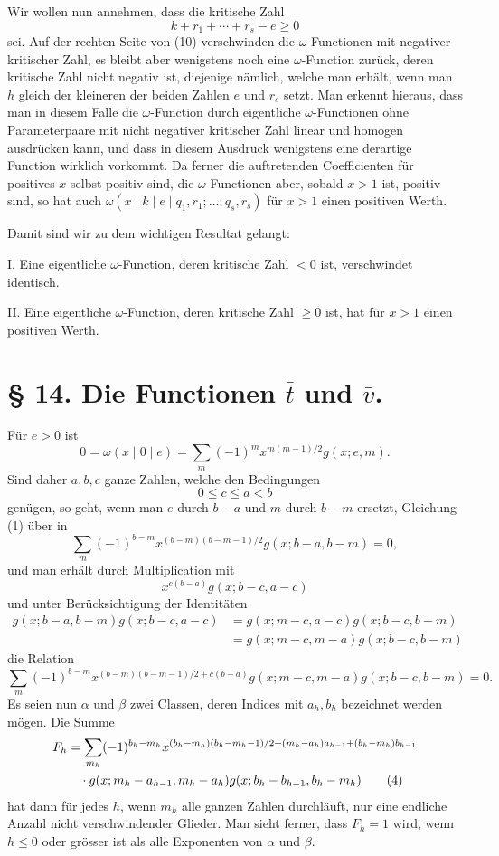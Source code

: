 Wir wollen nun annehmen, dass die kritische Zahl
\[
 k+r_1+\cdots+r_s-e\ge0
\]
sei. Auf der rechten Seite von (10) verschwinden die $\omega$-Functionen mit negativer kritischer Zahl, es bleibt aber wenigstens noch eine $\omega$-Function zurück, deren kritische Zahl nicht negativ ist, diejenige nämlich, welche man erhält, wenn man $h$ gleich der kleineren der beiden Zahlen $e$ und $r_s$ setzt. Man erkennt hieraus, dass man in diesem Falle die $\omega$-Function durch eigentliche $\omega$-Functionen ohne Parameterpaare mit nicht negativer kritischer Zahl linear und homogen ausdrücken kann, und dass in diesem Ausdruck wenigstens eine derartige Function wirklich vorkommt. Da ferner die auftretenden Coefficienten für positives $x$ selbst positiv sind, die $\omega$-Functionen aber, sobald $x>1$ ist, positiv sind, so hat auch $\omega(x\mid k\mid e\mid q_1,r_1;\ldots;q_s,r_s)$ für $x>1$ einen positiven Werth.

Damit sind wir zu dem wichtigen Resultat gelangt:

I. Eine eigentliche $\omega$-Function, deren kritische Zahl $<0$ ist, verschwindet identisch.

II. Eine eigentliche $\omega$-Function, deren kritische Zahl $\ge0$ ist, hat für $x>1$ einen positiven Werth.

\section*{§ 14. Die Functionen $\bar t$ und $\bar v$.}

Für $e>0$ ist
\begin{equation}
 0=\omega(x\mid0\mid e)=\sum_m(-1)^m x^{m(m-1)/2}g(x;e,m).
\tag{1}
\end{equation}
Sind daher $a,b,c$ ganze Zahlen, welche den Bedingungen
\begin{equation}
 0\le c\le a<b
\tag{2}
\end{equation}
genügen, so geht, wenn man $e$ durch $b-a$ und $m$ durch $b-m$ ersetzt, Gleichung (1) über in
\[
 \sum_m(-1)^{b-m}x^{(b-m)(b-m-1)/2}g(x;b-a,b-m)=0,
\]
und man erhält durch Multiplication mit
\[
 x^{c(b-a)}g(x;b-c,a-c)
\]
und unter Berücksichtigung der Identitäten
\begin{align*}
 g(x;b-a,b-m)g(x;b-c,a-c)
 &=g(x;m-c,a-c)g(x;b-c,b-m)\\
 &=g(x;m-c,m-a)g(x;b-c,b-m)
\end{align*}
die Relation
\begin{equation}
 \sum_m(-1)^{b-m}x^{(b-m)(b-m-1)/2+c(b-a)}
 g(x;m-c,m-a)g(x;b-c,b-m)=0.
\tag{3}
\end{equation}
Es seien nun $\alpha$ und $\beta$ zwei Classen, deren Indices mit $a_h,b_h$ bezeichnet werden mögen. Die Summe
\begin{align}
F_h&=\sum_{m_h}(-1)^{b_h-m_h}
 x^{(b_h-m_h)(b_h-m_h-1)/2+(m_h-a_h)a_{h-1}+(b_h-m_h)b_{h-1}}\notag\\
&\quad\cdot g(x;m_h-a_{h-1},m_h-a_h)g(x;b_h-b_{h-1},b_h-m_h)
\tag{4}
\end{align}
hat dann für jedes $h$, wenn $m_h$ alle ganzen Zahlen durchläuft, nur eine endliche Anzahl nicht verschwindender Glieder. Man sieht ferner, dass $F_h=1$ wird, wenn $h\le0$ oder grösser ist als alle Exponenten von $\alpha$ und $\beta$.

